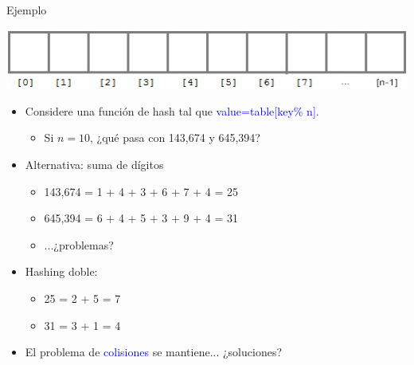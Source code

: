 \documentclass[handout]{beamer} %
\newcommand{\blue}[1]{\textcolor{blue}{#1}}
\begin{document}
\begin{frame}{Ejemplo}
    \begin{center}
        \includegraphics[width=.8\textwidth]{./image/cap4/array.png}
    \end{center}
    \begin{itemize}
        \item<1-> Considere una función de hash tal que \blue{value=table[key\% n]}.
        \begin{itemize}
            \item<2-> Si $n=10$, ¿qué pasa con 143,674 y 645,394?
        \end{itemize}
        \item<3-> Alternativa: suma de dígitos
        \begin{itemize}
            \item<3-> 143,674 = 1 + 4 + 3 + 6 + 7 + 4 = 25
            \item<3-> 645,394 = 6 + 4 + 5 + 3 + 9 + 4 = 31
            \item<4-> ...¿problemas?
        \end{itemize}
        \item<5-> Hashing doble:
        \begin{itemize}
            \item 25 = 2 + 5 = 7
            \item 31 = 3 + 1 = 4
        \end{itemize}
        \item<6-> El problema de \blue{colisiones} se mantiene... ¿soluciones?
    \end{itemize}
\end{frame}
\end{document}
